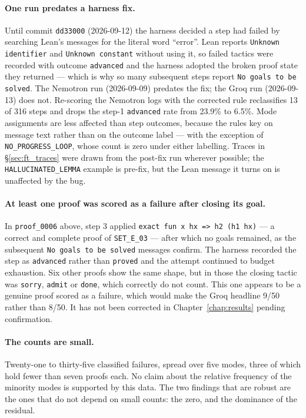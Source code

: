 \paragraph{One run predates a harness fix.}
Until commit \texttt{dd33000} (2026-09-12) the harness decided a step had failed
by searching Lean's messages for the literal word ``error''. Lean reports
\texttt{Unknown identifier} and \texttt{Unknown constant} without using it, so
failed tactics were recorded with outcome \texttt{advanced} and the harness
adopted the broken proof state they returned --- which is why so many
subsequent steps report \texttt{No goals to be solved}. The Nemotron run
(2026-09-09) predates the fix; the Groq run (2026-09-13) does not.
Re-scoring the Nemotron logs with the corrected rule reclassifies 13 of 316
steps and drops the step-1 \texttt{advanced} rate from 23.9\% to 6.5\%.
Mode assignments are less affected than step outcomes, because the rules key on
message text rather than on the outcome label --- with the exception of
\texttt{NO\_PROGRESS\_LOOP}, whose count is zero under either labelling.
Traces in \S\ref{sec:ft_traces} were drawn from the post-fix run wherever
possible; the \texttt{HALLUCINATED\_LEMMA} example is pre-fix, but the Lean
message it turns on is unaffected by the bug.

\paragraph{At least one proof was scored as a failure after closing its goal.}
In \texttt{proof\_0006} above, step 3 applied
\texttt{exact fun x hx => h2 (h1 hx)} --- a correct and complete proof of
\texttt{SET\_E\_03} --- after which no goals remained, as the subsequent
\texttt{No goals to be solved} messages confirm. The harness recorded the step
as \texttt{advanced} rather than \texttt{proved} and the attempt continued to
budget exhaustion. Six other proofs show the same shape, but in those the
closing tactic was \texttt{sorry}, \texttt{admit} or \texttt{done}, which
correctly do not count. This one appears to be a genuine proof scored as a
failure, which would make the Groq headline 9/50 rather than 8/50. It has not
been corrected in Chapter~\ref{chap:results} pending confirmation.

\paragraph{The counts are small.}
Twenty-one to thirty-five classified failures, spread over five modes, three of
which hold fewer than seven proofs each. No claim about the relative frequency
of the minority modes is supported by this data. The two findings that are
robust are the ones that do not depend on small counts: the zero, and the
dominance of the residual.
